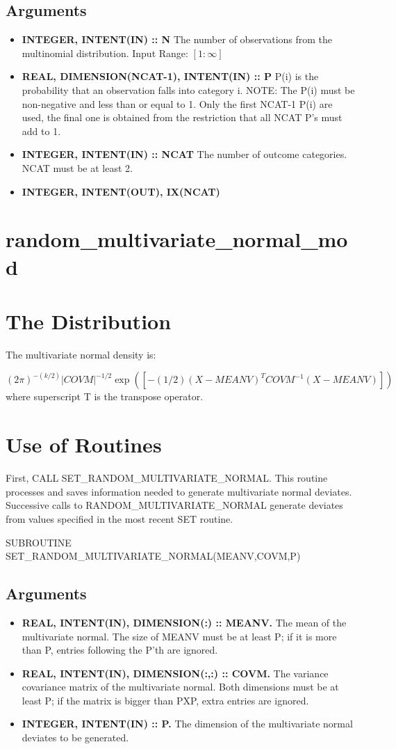 \documentclass[12pt,dvips]{article}
\newcommand{\mysection}[1]{\color{blue}
            \section{#1} \normalcolor}
\newcommand{\mysubsection}[1] {\color{green}
            \subsection{#1} \normalcolor}
\newcommand{\myitem}[1]{\item{\bf \color{Violet} #1 \normalcolor}}
\newcommand{\inrange}[2]{\hfill Input Range: \ensuremath{\left[ #1:#2
\right]}\\}
\begin{document}
\mysubsection{Arguments}

\begin{itemize}

\myitem{INTEGER, INTENT(IN) :: N} The number of observations from the 
multinomial distribution.
\inrange{1}{\infty}

\myitem{REAL,   DIMENSION(NCAT-1),  INTENT(IN)   ::  P}   P(i)   is  the
probability that an observation falls into category i.  NOTE: The P(i)
must be  non-negative and  less than  or equal to  1.  Only  the first
NCAT-1 P(i) are  used, the final one is  obtained from the restriction
that all NCAT P's must add to 1.

\myitem{INTEGER, INTENT(IN) :: NCAT}  The number of outcome categories.
NCAT must be at least 2.

\myitem{INTEGER, INTENT(OUT), IX(NCAT)} 

\end{itemize}

\pagebreak

\mysection{random\_multivariate\_normal\_mod}

\mysection{The Distribution}

The multivariate normal density is:

\[ (2 \pi)^{-(k/2)} |COVM|^{-1/2} \exp(\left[ -(1/2)(X-MEANV)^T
COVM^{-1} (X-MEANV)\right] ) \]
where superscript T is the transpose operator.

\mysection{Use of Routines}

First, CALL SET\_RANDOM\_MULTIVARIATE\_NORMAL.  This routine processes
and saves information needed to generate multivariate normal deviates.
Successive calls to RANDOM\_MULTIVARIATE\_NORMAL generate deviates
from values specified in the most recent SET routine.

SUBROUTINE SET\_RANDOM\_MULTIVARIATE\_NORMAL(MEANV,COVM,P)

\mysubsection{Arguments}

\begin{itemize}

\myitem{REAL, INTENT(IN), DIMENSION(:) :: MEANV.} The mean of the
multivariate normal.  The size of MEANV must be at least P; if it is
more than P, entries following the P'th are ignored.

\myitem{REAL,  INTENT(IN),   DIMENSION(:,:)  ::  COVM.}    The  variance
covariance matrix of the multivariate normal.  Both dimensions must be
at  least P;  if the  matrix  is bigger  than PXP,  extra entries  are
ignored.

\myitem{INTEGER,  INTENT(IN) ::  P.} The  dimension of  the multivariate
normal deviates to be generated.

\end{itemize}
\end{document}

